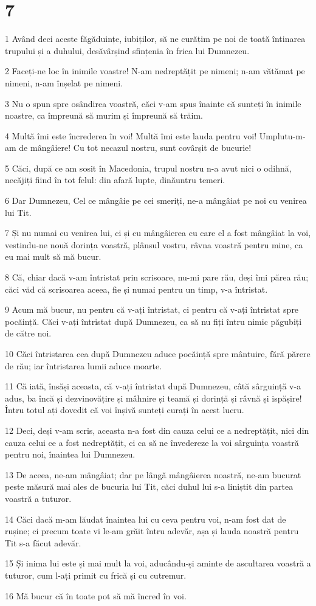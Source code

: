 \chapter{7}

\par 1 Având deci aceste făgăduințe, iubiților, să ne curățim pe noi de toată întinarea trupului și a duhului, desăvârșind sfințenia în frica lui Dumnezeu.
\par 2 Faceți-ne loc în inimile voastre! N-am nedreptățit pe nimeni; n-am vătămat pe nimeni, n-am înșelat pe nimeni.
\par 3 Nu o spun spre osândirea voastră, căci v-am spus înainte că sunteți în inimile noastre, ca împreună să murim și împreună să trăim.
\par 4 Multă îmi este încrederea în voi! Multă îmi este lauda pentru voi! Umplutu-m-am de mângâiere! Cu tot necazul nostru, sunt covârșit de bucurie!
\par 5 Căci, după ce am sosit în Macedonia, trupul nostru n-a avut nici o odihnă, necăjiți fiind în tot felul: din afară lupte, dinăuntru temeri.
\par 6 Dar Dumnezeu, Cel ce mângâie pe cei smeriți, ne-a mângâiat pe noi cu venirea lui Tit.
\par 7 Și nu numai cu venirea lui, ci și cu mângâierea cu care el a fost mângâiat la voi, vestindu-ne nouă dorința voastră, plânsul vostru, râvna voastră pentru mine, ca eu mai mult să mă bucur.
\par 8 Că, chiar dacă v-am întristat prin scrisoare, nu-mi pare rău, deși îmi părea rău; căci văd că scrisoarea aceea, fie și numai pentru un timp, v-a întristat.
\par 9 Acum mă bucur, nu pentru că v-ați întristat, ci pentru că v-ați întristat spre pocăință. Căci v-ați întristat după Dumnezeu, ca să nu fiți întru nimic păgubiți de către noi.
\par 10 Căci întristarea cea după Dumnezeu aduce pocăință spre mântuire, fără părere de rău; iar întristarea lumii aduce moarte.
\par 11 Că iată, însăși aceasta, că v-ați întristat după Dumnezeu, câtă sârguință v-a adus, ba încă și dezvinovățire și mâhnire și teamă și dorință și râvnă și ispășire! Întru totul ați dovedit că voi înșivă sunteți curați în acest lucru.
\par 12 Deci, deși v-am scris, aceasta n-a fost din cauza celui ce a nedreptățit, nici din cauza celui ce a fost nedreptățit, ci ca să ne învedereze la voi sârguința voastră pentru noi, înaintea lui Dumnezeu.
\par 13 De aceea, ne-am mângâiat; dar pe lângă mângâierea noastră, ne-am bucurat peste măsură mai ales de bucuria lui Tit, căci duhul lui s-a liniștit din partea voastră a tuturor.
\par 14 Căci dacă m-am lăudat înaintea lui cu ceva pentru voi, n-am fost dat de rușine; ci precum toate vi le-am grăit întru adevăr, așa și lauda noastră pentru Tit s-a făcut adevăr.
\par 15 Și inima lui este și mai mult la voi, aducându-și aminte de ascultarea voastră a tuturor, cum l-ați primit cu frică și cu cutremur.
\par 16 Mă bucur că în toate pot să mă încred în voi.

